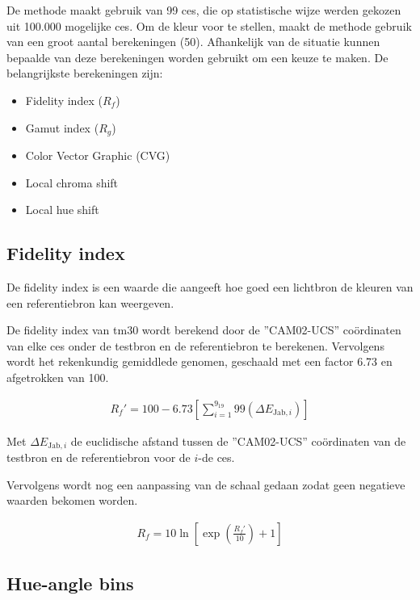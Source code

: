 De methode maakt gebruik van 99 \gls{ces}, die op statistische wijze werden gekozen uit 100.000 mogelijke \gls{ces}. Om de kleur voor te stellen, maakt de methode gebruik van een groot aantal berekeningen (50). Afhankelijk van de situatie kunnen bepaalde van deze berekeningen worden gebruikt om een keuze te maken. De belangrijkste berekeningen zijn:

\begin{itemize}
    \item Fidelity index ($R_f$)
    \item Gamut index ($R_g$)
    \item Color Vector Graphic (CVG)
    \item Local chroma shift
    \item Local hue shift
\end{itemize}


\subsection{Fidelity index}

De fidelity index is een waarde die aangeeft hoe goed een lichtbron de kleuren van een referentiebron kan weergeven.

De fidelity index van tm30 wordt berekend door de ''CAM02-UCS'' co\"ordinaten van elke \gls{ces} onder de testbron en de referentiebron te berekenen. Vervolgens wordt het rekenkundig gemiddlede genomen, geschaald met een factor 6.73 en afgetrokken van 100.

\begin{align}
    R_f' = 100 - 6.73 \left[ \sum_{i=1}^{9_{19}} 99 \left( \Delta E_{\text{Jab},i} \right) \right]
\end{align}

Met $\Delta E_{\text{Jab},i}$ de euclidische afstand tussen de ''CAM02-UCS'' co\"ordinaten van de testbron en de referentiebron voor de $i$-de \gls{ces}.

Vervolgens wordt nog een aanpassing van de schaal gedaan zodat geen negatieve waarden bekomen worden.

\begin{align}
    R_f = 10 \ln \left[ \exp \left( \frac{R_f'}{10} \right) + 1 \right]
\end{align}

\subsection{Hue-angle bins}

